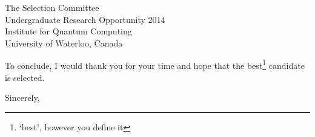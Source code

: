 \documentclass{letter}
\begin{document}
\begin{letter}{The Selection Committee\\Undergraduate Research Opportunity 2014\\Institute for Quantum Computing\\University of Waterloo, Canada}
\begin{enumerate}





\end{enumerate}


To conclude, I would thank you for your time and hope that the best\footnote{`best', however you define it} candidate is selected.


\vspace{2\parskip} %
\closing{Sincerely,}
\vspace{2\parskip} %




\end{letter}
 
\end{document}
